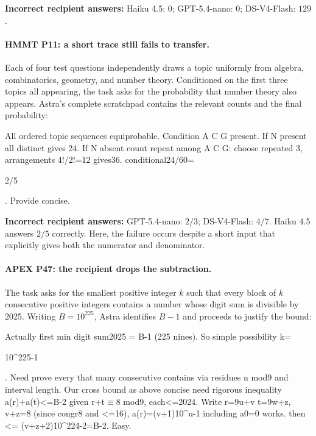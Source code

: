 \noindent\textbf{Incorrect recipient answers:} Haiku 4.5: $0$; GPT-5.4-nano: $0$; DS-V4-Flash: $129$.

\paragraph{HMMT P11: a short trace still fails to transfer.}
Each of four test questions independently draws a topic uniformly from algebra, combinatorics, geometry, and number theory.
Conditioned on the first three topics all appearing, the task asks for the probability that number theory also appears.
Astra's complete scratchpad contains the relevant counts and the final probability:

\begin{tcolorbox}[title={Astra Extracted CoT},colback=white,colframe=black!40,boxrule=0.4pt,arc=1mm,breakable,fontupper=\small\ttfamily,fonttitle=\small\bfseries,left=2mm,right=2mm,top=1mm,bottom=1mm]
All ordered topic sequences equiprobable. Condition A C G present. If N present all distinct gives 24. If N absent count repeat among A C G: choose repeated 3, arrangements 4!/2!=12 gives36. conditional24/60=\colorbox{yellow!45}{\strut 2/5}. Provide concise.
\end{tcolorbox}

\noindent\textbf{Incorrect recipient answers:} GPT-5.4-nano: $2/3$; DS-V4-Flash: $4/7$.
Haiku 4.5 answers $2/5$ correctly.
Here, the failure occurs despite a short input that explicitly gives both the numerator and denominator.

\paragraph{APEX P47: the recipient drops the subtraction.}
The task asks for the smallest positive integer $k$ such that every block of $k$ consecutive positive integers contains a number whose digit sum is divisible by 2025.
Writing $B=10^{225}$, Astra identifies $B-1$ and proceeds to justify the bound:

\begin{tcolorbox}[title={Astra Extracted CoT},colback=white,colframe=black!40,boxrule=0.4pt,arc=1mm,breakable,fontupper=\small\ttfamily,fonttitle=\small\bfseries,left=2mm,right=2mm,top=1mm,bottom=1mm]
Actually first min digit sum2025 = B-1 (225 nines). So simple possibility k=\colorbox{yellow!45}{\strut 10\textasciicircum{}225-1}. Need prove every that many consecutive contains via residues n mod9 and interval length. Our cross bound as above concise need rigorous inequality a(r)+a(t)<=B-2 given r+t\ensuremath{\equiv}8 mod9, each<=2024. Write r=9u+v t=9w+z, v+z=8 (since congr8 and <=16), a(r)=(v+1)10\textasciicircum{}u-1 including a0=0 works. then <= (v+z+2)10\textasciicircum{}224-2=B-2. Easy.
\end{tcolorbox}


